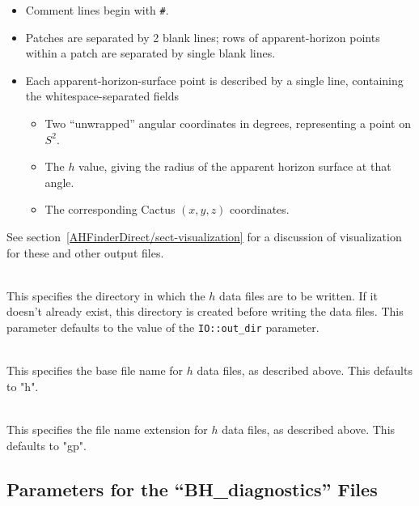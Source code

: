 \begin{description}
\begin{description}
\begin{itemize}
\begin{itemize}
			\end{itemize}
		\item	Comment lines begin with \verb|#|.
		\item	Patches are separated by 2 blank lines;
			rows of apparent-horizon points within a patch
			are separated by single blank lines.
		\item	Each apparent-horizon-surface point
			is described by a single line, containing
			the whitespace-separated fields
			\begin{itemize}
			\item	Two ``unwrapped'' angular coordinates
				in degrees, representing a point on $S^2$.
			\item	The $h$ value, giving the radius
				of the apparent horizon surface
				at that angle.
			\item	The corresponding Cactus $(x,y,z)$
				coordinates.
			\end{itemize}
		\end{itemize}
		See section~\ref{AHFinderDirect/sect-visualization}
		for a discussion of visualization for these and other
		 output files.
	\end{description}

\item[\code{h\_directory}]
\mbox{}\\
	This specifies the directory in which the $h$ data files
	are to be written.  If it doesn't already exist, this directory
	is created before writing the data files.  This parameter
	defaults to the value of the \verb|IO::out_dir| parameter.

\item[\code{h\_base\_file\_name}]
\mbox{}\\
	This specifies the base file name for $h$ data files, as
	described above.  This defaults to "h".

\item[\code{ASCII\_gnuplot\_file\_name\_extension}]
\mbox{}\\
	This specifies the file name extension for $h$ data files, as
	described above.  This defaults to "gp".
\end{description}


\subsection{Parameters for the ``BH\_diagnostics'' Files}
\label{AHFinderDirect/sect-parameters/BH-diagnostics-parameters}

